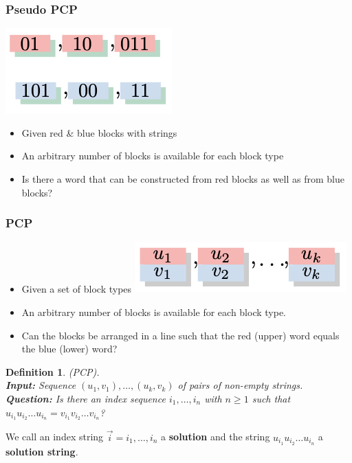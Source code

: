 \documentclass[a3paper, 8pt]{extarticle}
\newtheorem*{definition}{Definition}
\begin{document}
\begin{multicols*}{6}
\subsubsection{Pseudo PCP}
\begin{center}
  \includegraphics[width = 0.3\columnwidth]{images/Screen Shot 2022-11-23 at 11.26.39.png}
\end{center}

\begin{itemize}
    \item Given red \& blue blocks with strings
    \item An arbitrary number of blocks is available for each block type
    \item Is there a word that can be constructed from red blocks as well as from blue blocks?
\end{itemize}

\subsubsection{PCP}
\begin{itemize}
    \item Given a set of block types \includegraphics[width = 0.4\columnwidth]{images/Screen Shot 2022-11-23 at 11.51.41.png} 
    \item An arbitrary number of blocks is available for each block type.
    \item  Can the blocks be arranged in a line such that the red (upper) word equals the blue (lower) word?
\end{itemize}
\begin{definition}
     (PCP).\\
    \textbf{Input:} Sequence $(u_1,v_1), \dots , (u_k,v_k)$ of pairs of non-empty strings.\\
    \textbf{Question:} Is there an index sequence $i_1, \dots, i_n$ with $n \geq 1$ such that $u_{i_1} u_{i_2} \dots u_{i_n} = v_{i_1} v_{i_2} \dots v_{i_n}$?
\end{definition}

We call an index string $\Vec{i}=i_1, \dots, i_n$ a \textbf{solution} and the string $u_{i_1}u_{i_2}\dots u_{i_n}$ a \textbf{solution string}.


\end{multicols*}
\end{document}
